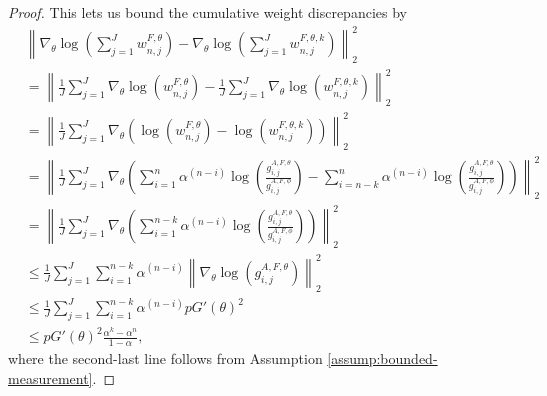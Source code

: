 \begin{proof}
This lets us bound the cumulative weight discrepancies by
\begin{align}
    &  \left\lVert\nabla_\theta\log\left(\sum_{j=1}^J w_{n,j}^{F,\theta}\right)-\nabla_\theta\log\left(\sum_{j=1}^J w_{n,j}^{F,\theta,k}\right)\right\rVert_2^2\\
    &= \left\lVert\frac{1}{J}\sum_{j=1}^J \nabla_\theta \log\left(w_{n,j}^{F,\theta}\right)-\frac{1}{J}\sum_{j=1}^J \nabla_\theta \log\left(w_{n,j}^{F,\theta,k}\right)\right\rVert_2^2 \\
    &= \left\lVert\frac{1}{J}\sum_{j=1}^J \nabla_\theta \left(\log\left(w_{n,j}^{F,\theta}\right)-\log\left(w_{n,j}^{F,\theta,k}\right)\right)\right\rVert_2^2\\
    &= \left\lVert\frac{1}{J}\sum_{j=1}^J \nabla_\theta \left(\sum_{i=1}^n\alpha^{(n-i)}\log\left(\frac{g_{i,j}^{A,F,\theta}}{g_{i,j}^{A,F,\phi}} \right) - \sum_{i=n-k}^n{\alpha^{(n-i)}}\log\left(\frac{g_{i,j}^{A,F,\theta}}{g_{i,j}^{A,F,\phi}} \right)\right)\right\rVert_2^2 \\
    &= \left\lVert\frac{1}{J}\sum_{j=1}^J \nabla_\theta \left(\sum_{i=1}^{n-k}\alpha^{(n-i)}\log\left(\frac{g_{i,j}^{A,F,\theta}}{g_{i,j}^{A,F,\phi}} \right) \right)\right\rVert_2^2\\
    &\leq \frac{1}{J}\sum_{j=1}^J \sum_{i=1}^{n-k}\alpha^{(n-i)}\left\lVert\nabla_\theta\log\left(g_{i,j}^{A,F,\theta} \right)\right\rVert_2^2\\
    &\leq \frac{1}{J}\sum_{j=1}^J \sum_{i=1}^{n-k}\alpha^{(n-i)}pG'(\theta)^2\\
    &\leq pG'(\theta)^2\frac{\alpha^k-\alpha^n}{1-\alpha},
\end{align}
where the second-last line follows from Assumption \ref{assump:bounded-measurement}.



\end{proof}

